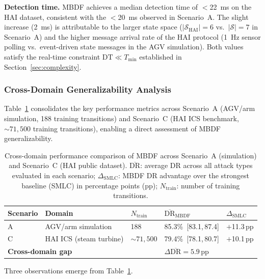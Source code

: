 \documentclass[manuscript,screen,review]{acmart}
\begin{document}
\textbf{Detection time.}
MBDF achieves a median detection time of $<$22~ms on the
HAI dataset, consistent with the $<$20~ms observed in
Scenario~A. The slight increase (2~ms) is attributable
to the larger state space
($|\mathcal{S}_{\mathrm{HAI}}| = 6$ vs.\
$|\mathcal{S}| = 7$ in Scenario~A) and the higher
message arrival rate of the HAI protocol (1~Hz sensor
polling vs.\ event-driven state messages in the AGV
simulation). Both values satisfy the real-time constraint
$\mathrm{DT} \ll T_{\min}$ established in
Section~\ref{sec:complexity}.

\subsubsection{Cross-Domain Generalizability Analysis}
\label{sec:generalizability}

Table~\ref{tab:cross_domain} consolidates the key
performance metrics across Scenario~A (AGV/arm
simulation, 188 training transitions) and Scenario~C
(HAI ICS benchmark, ${\sim}71{,}500$ training
transitions), enabling a direct assessment of MBDF
generalizability.

\begin{table}[!t]
\renewcommand{\arraystretch}{1.3}
\caption{Cross-domain performance comparison of MBDF
across Scenario~A (simulation) and Scenario~C (HAI
public dataset). $\overline{\mathrm{DR}}$: average DR
across all attack types evaluated in each scenario;
$\Delta_{\mathrm{SMLC}}$: MBDF DR advantage over the
strongest baseline (SMLC) in percentage points (pp);
$N_{\mathrm{train}}$: number of training transitions.}
\label{tab:cross_domain}
\centering
\small
\begin{tabular}{lllll}
\toprule
\textbf{Scenario} & \textbf{Domain} &
$N_{\mathrm{train}}$ &
$\overline{\mathrm{DR}}_{\mathrm{MBDF}}$ &
$\Delta_{\mathrm{SMLC}}$ \\
\midrule
A & AGV/arm simulation  & 188
  & 85.3\%\ [83.1,\,87.4] & $+$11.3\,pp \\
C & HAI ICS (steam turbine) & ${\sim}71{,}500$
  & 79.4\%\ [78.1,\,80.7] & $+$10.1\,pp \\
\midrule
\multicolumn{3}{l}{\textbf{Cross-domain gap}} &
\multicolumn{2}{l}{$\Delta\overline{\mathrm{DR}} = 5.9$\,pp} \\
\bottomrule
\end{tabular}
\end{table}

Three observations emerge from Table~\ref{tab:cross_domain}.
\end{document}
